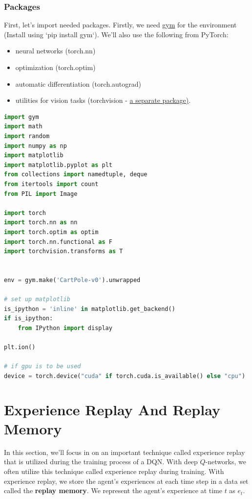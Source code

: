 \subsubsection{Packages}

First, let's import needed packages. Firstly, we need \href{https://github.com/openai/gym}{gym} 
for the environment (Install using `pip install gym`). We'll also use the following from 
PyTorch:
\begin{itemize}
\setlength{\parskip}{0pt}
\item
neural networks (torch.nn)

\item
optimization (torch.optim)

\item
automatic differentiation (torch.autograd)

\item
utilities for vision tasks (torchvision - \href{https://github.com/pytorch/vision}{a separate package)}.
\end{itemize}

\begin{lstlisting}[language=Python]
import gym
import math
import random
import numpy as np
import matplotlib
import matplotlib.pyplot as plt
from collections import namedtuple, deque
from itertools import count
from PIL import Image

import torch
import torch.nn as nn
import torch.optim as optim
import torch.nn.functional as F
import torchvision.transforms as T


env = gym.make('CartPole-v0').unwrapped

# set up matplotlib
is_ipython = 'inline' in matplotlib.get_backend()
if is_ipython:
    from IPython import display

plt.ion()

# if gpu is to be used
device = torch.device("cuda" if torch.cuda.is_available() else "cpu")
\end{lstlisting}


\section{Experience Replay And Replay Memory}

In this section, we'll focus in on an important technique called experience replay 
that is utilized during the training process of a DQN. With deep $Q$-networks, we 
often utilize this technique called experience replay during training. With experience 
replay, we store the agent's experiences at each time step in a data set called the 
{\bf replay memory}. We represent the agent's experience at time $t$ as $e_t$.

